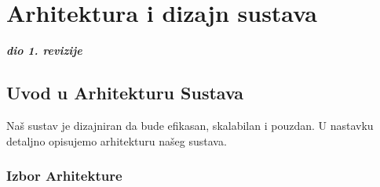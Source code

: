 \chapter{Arhitektura i dizajn sustava}

\textbf{\textit{dio 1. revizije}}\\

\section*{Uvod u Arhitekturu Sustava}
Naš sustav je dizajniran da bude efikasan, skalabilan i pouzdan. U nastavku detaljno opisujemo arhitekturu našeg sustava.

\subsection*{Izbor Arhitekture}
